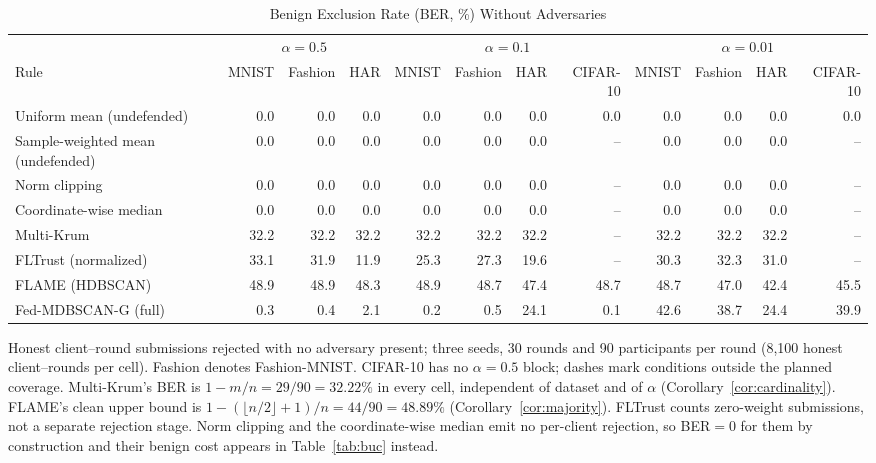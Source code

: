 \begin{table}[!tp]
\centering\footnotesize
\setlength{\tabcolsep}{4pt}
\caption{Benign Exclusion Rate (BER, \%) Without Adversaries}\label{tab:ber}
\begin{adjustbox}{max width=\textwidth}
\begin{tabular}{lrrrrrrrrrrr}
\toprule
& \multicolumn{3}{c}{$\alpha=0.5$} & \multicolumn{4}{c}{$\alpha=0.1$} & \multicolumn{4}{c}{$\alpha=0.01$} \\
\cmidrule(lr){2-4}\cmidrule(lr){5-8}\cmidrule(lr){9-12}
Rule & MNIST & Fashion & HAR & MNIST & Fashion & HAR & CIFAR-10 & MNIST & Fashion & HAR & CIFAR-10 \\
\midrule
Uniform mean (undefended) & 0.0 & 0.0 & 0.0 & 0.0 & 0.0 & 0.0 & 0.0 & 0.0 & 0.0 & 0.0 & 0.0 \\
Sample-weighted mean (undefended) & 0.0 & 0.0 & 0.0 & 0.0 & 0.0 & 0.0 & -- & 0.0 & 0.0 & 0.0 & -- \\
Norm clipping & 0.0 & 0.0 & 0.0 & 0.0 & 0.0 & 0.0 & -- & 0.0 & 0.0 & 0.0 & -- \\
Coordinate-wise median & 0.0 & 0.0 & 0.0 & 0.0 & 0.0 & 0.0 & -- & 0.0 & 0.0 & 0.0 & -- \\
Multi-Krum & 32.2 & 32.2 & 32.2 & 32.2 & 32.2 & 32.2 & -- & 32.2 & 32.2 & 32.2 & -- \\
FLTrust (normalized) & 33.1 & 31.9 & 11.9 & 25.3 & 27.3 & 19.6 & -- & 30.3 & 32.3 & 31.0 & -- \\
FLAME (HDBSCAN) & 48.9 & 48.9 & 48.3 & 48.9 & 48.7 & 47.4 & 48.7 & 48.7 & 47.0 & 42.4 & 45.5 \\
Fed-MDBSCAN-G (full) & 0.3 & 0.4 & 2.1 & 0.2 & 0.5 & 24.1 & 0.1 & 42.6 & 38.7 & 24.4 & 39.9 \\
\bottomrule
\end{tabular}
\end{adjustbox}

\par\vspace{3pt}\parbox{\linewidth}{\footnotesize Honest client--round submissions rejected with no adversary present; three seeds, 30 rounds and 90 participants per round (8{,}100 honest client--rounds per cell). Fashion denotes Fashion-MNIST. CIFAR-10 has no $\alpha=0.5$ block; dashes mark conditions outside the planned coverage. Multi-Krum's BER is $1-m/n=29/90=32.22\%$ in every cell, independent of dataset and of $\alpha$ (Corollary~\ref{cor:cardinality}). FLAME's clean upper bound is $1-(\lfloor n/2\rfloor+1)/n=44/90=48.89\%$ (Corollary~\ref{cor:majority}). FLTrust counts zero-weight submissions, not a separate rejection stage. Norm clipping and the coordinate-wise median emit no per-client rejection, so BER${}=0$ for them by construction and their benign cost appears in Table~\ref{tab:buc} instead.}
\end{table}
